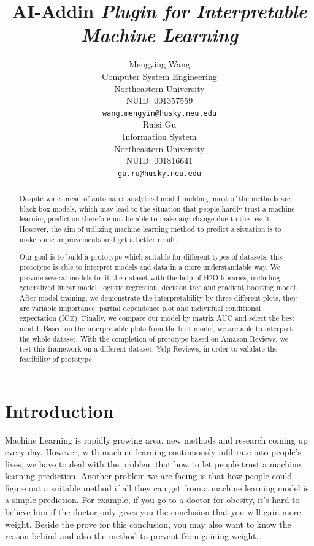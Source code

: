 \documentclass{article}
\title{AI-Addin \emph{Plugin for Interpretable Machine Learning}}
\author{
  Mengying Wang \\
  Computer System Engineering \\
  Northeastern University\\
  NUID: 001357559 \\
  \texttt{wang.mengyin@husky.neu.edu} \\
   \And
 Ruisi Gu \\
  Information System\\
  Northeastern University\\
  NUID: 001816641 \\
  \texttt{gu.ru@husky.neu.edu} \\
}
\begin{document}
\maketitle

\begin{abstract}
Despite widespread of automates analytical model building, most of the methods are black box models, which may lead to the situation that people hardly trust a machine learning prediction therefore not be able to make any change due to the result. However, the aim of utilizing machine learning method to predict a situation is to make some improvements and get a better result.

Our goal is to build a prototype which suitable for different types of datasets, this prototype is able to interpret models and data in a more understandable way. We provide several models to fit the dataset with the help of H2O libraries, including generalized linear model, logistic regression, decision tree and gradient boosting model. After model training, we demonstrate the interpretability by three different plots, they are variable importance, partial dependence plot and individual conditional expectation (ICE). Finally, we compare our model by matrix AUC and select the best model. Based on the interpretable plots from the best model, we are able to interpret the whole dataset. With the completion of prototype based on Amazon Reviews, we test this framework on a different dataset, Yelp Reviews, in order to validate the feasibility of prototype\cite{glm}.
\end{abstract}




\section{Introduction}
Machine Learning is rapidly growing area, new methods and research coming up every day. However, with machine learning continuously infiltrate into people’s lives, we have to deal with the problem that how to let people trust a machine learning prediction. Another problem we are facing is that how people could figure out a suitable method if all they can get from a machine learning model is a simple prediction. For example, if you go to a doctor for obesity, it’s hard to believe him if the doctor only gives you the conclusion that you will gain more weight. Beside the prove for this conclusion, you may also want to know the reason behind and also the method to prevent from gaining weight\cite{ml}.
\end{document}
